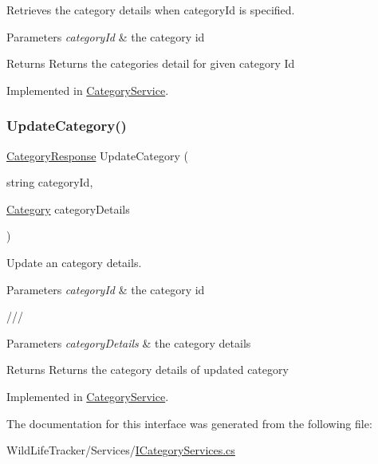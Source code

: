 Retrieves the category details when category\+Id is specified. 
\begin{DoxyParams}{Parameters}
{\em category\+Id} & the category id\\
\hline
\end{DoxyParams}
\begin{DoxyReturn}{Returns}
Returns the categories detail for given category Id
\end{DoxyReturn}




Implemented in \hyperlink{classWildLifeTracker_1_1CategoryService_ac989af6747cc8b28f508ef7a4645d22f}{Category\+Service}.

\mbox{\label{interfaceWildLifeTracker_1_1ICategoryService_adbaa7c66fd8789233e4d6f91ab3a4a2f}} 
\subsubsection{\texorpdfstring{Update\+Category()}{UpdateCategory()}}
{\footnotesize\ttfamily \hyperlink{classWildLifeTracker_1_1Response_1_1CategoryResponse}{Category\+Response} Update\+Category (\begin{DoxyParamCaption}\item[{string}]{category\+Id,  }\item[{\hyperlink{classWildLifeTracker_1_1Models_1_1Category}{Category}}]{category\+Details }\end{DoxyParamCaption})}



Update an category details. 
\begin{DoxyParams}{Parameters}
{\em category\+Id} & the category id\\
\hline
\end{DoxyParams}
/// 
\begin{DoxyParams}{Parameters}
{\em category\+Details} & the category details\\
\hline
\end{DoxyParams}
\begin{DoxyReturn}{Returns}
Returns the category details of updated category
\end{DoxyReturn}




Implemented in \hyperlink{classWildLifeTracker_1_1CategoryService_adbaa7c66fd8789233e4d6f91ab3a4a2f}{Category\+Service}.



The documentation for this interface was generated from the following file\+:\begin{DoxyCompactItemize}
\item 
Wild\+Life\+Tracker/\+Services/\hyperlink{ICategoryServices_8cs}{I\+Category\+Services.\+cs}\end{DoxyCompactItemize}
